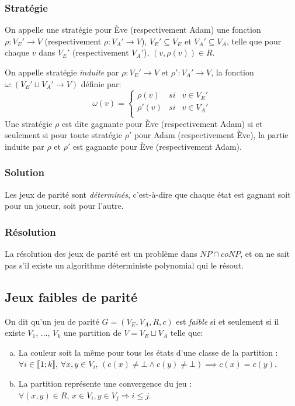 \documentclass[10pt,a4paper]{article}
\begin{document}
\subsubsection{Stratégie}
On appelle une stratégie pour Ève (respectivement Adam) une fonction $\rho : V_E' \to V$ (respectivement $\rho : V_A' \to V$), $V_E' \subseteq V_E$ et $V_A' \subseteq V_A$, telle que pour chaque $v$ dans $V_E'$ (respectivement $V_A'$), $(v, \rho(v)) \in R$.

On appelle stratégie \emph{induite} par $\rho : V_E' \to V$ et $\rho' : V_A' \to V$, la fonction $\omega : (V_E' \sqcup V_A' \to V)$ définie par:
\\
$$\omega(v) = \left \{
\begin{array}{rcl}
\rho(v) & si & v \in V_E'\\
\rho'(v) & si & v \in V_A'\\
\end{array}
\right .$$
Une stratégie $\rho$ est dite gagnante pour Ève (respectivement Adam) si et seulement si pour toute stratégie $\rho'$ pour Adam (respectivement Ève), la partie induite par $\rho$ et $\rho'$ est gagnante pour Ève (respectivement Adam).

\subsubsection{Solution}
Les jeux de parité sont \emph{déterminés}, c'est-à-dire que chaque état est gagnant soit pour un joueur, soit pour l'autre.

\subsubsection{Résolution}
La résolution des jeux de parité est un problème dans $NP \cap coNP$, et on ne sait pas s'il existe un algorithme déterministe polynomial qui le résout.

\subsection{Jeux faibles de parité}
\label{fpg}

On dit qu'un jeu de parité $G = (V_E,V_A,R,c)$ est \emph{faible}  si et seulement si il existe $V_1$, ..., $V_k$ une partition de $V = V_E \sqcup V_A$ telle que:
\begin{enumerate}[a)]
\item La couleur soit la même pour tous les états d'une classe de la partition : $\forall i \in \llbracket 1 ; k \rrbracket$, $\forall x, y \in V_i$, $(c(x) \neq \bot \land c(y) \neq \bot)  \implies c(x) = c(y)$.
\item La partition représente une convergence du jeu :\\
$\forall (x, y) \in R$, $x\in V_i, y \in V_j \Rightarrow i \leq j$.
\end{enumerate}
\end{document}
